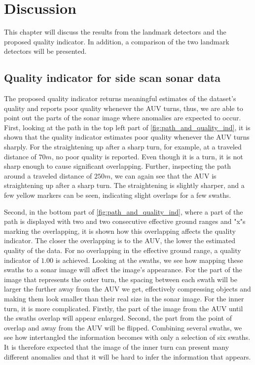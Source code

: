 \chapter{Discussion}

This chapter will discuss the results from the landmark detectors and the proposed quality indicator. In addition, a comparison of the two landmark detectors will be presented. 

\section{Quality indicator for side scan sonar data}

The proposed quality indicator returns meaningful estimates of the dataset's quality and reports poor quality whenever the AUV turns, thus, we are able to point out the parts of the sonar image where anomalies are expected to occur. First, looking at the path in the top left part of \cref{fig:path_and_quality_ind}, it is shown that the quality indicator estimates poor quality whenever the AUV turns sharply. For the straightening up after a sharp turn, for example, at a traveled distance of $70 m$, no poor quality is reported. Even though it is a turn, it is not sharp enough to cause significant overlapping. Further, inspecting the path around a traveled distance of $250 m$, we can again see that the AUV is straightening up after a sharp turn. The straightening is slightly sharper, and a few yellow markers can be seen, indicating slight overlaps for a few swaths. 

Second, in the bottom part of \cref{fig:path_and_quality_ind}, where a part of the path is displayed with two and two consecutive effective ground ranges and "x"s marking the overlapping, it is shown how this overlapping affects the quality indicator. The closer the overlapping is to the AUV, the lower the estimated quality of the data. For no overlapping in the effective ground range, a quality indicator of $1.00$ is achieved. Looking at the swaths, we see how mapping these swaths to a sonar image will affect the image's appearance. For the part of the image that represents the outer turn, the spacing between each swath will be larger the further away from the AUV we get, effectively compressing objects and making them look smaller than their real size in the sonar image. For the inner turn, it is more complicated. Firstly, the part of the image from the AUV until the swaths overlap will appear enlarged. Second, the part from the point of overlap and away from the AUV will be flipped. Combining several swaths, we see how intertangled the information becomes with only a selection of six swaths. It is therefore expected that the image of the inner turn can present many different anomalies and that it will be hard to infer the information that appears. 


